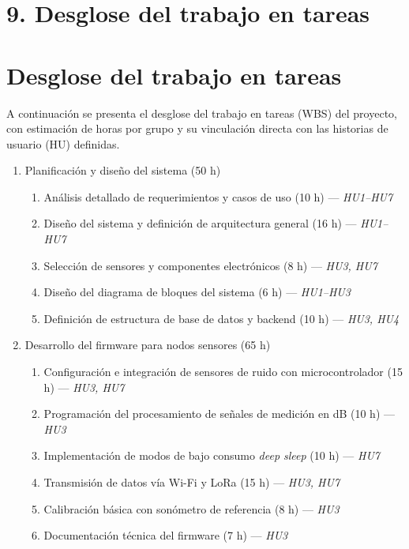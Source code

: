 \documentclass[
11pt, %
]{charter}
\begin{document}
\section{9. Desglose del trabajo en tareas}
\label{sec:wbs}

\section{Desglose del trabajo en tareas}

A continuación se presenta el desglose del trabajo en tareas (WBS) del proyecto, con estimación de horas por grupo y su vinculación directa con las historias de usuario (HU) definidas.

\begin{enumerate}
    \item Planificación y diseño del sistema (50 h)
    \begin{enumerate}
        \item Análisis detallado de requerimientos y casos de uso (10 h) — \textit{HU1–HU7}
        \item Diseño del sistema y definición de arquitectura general (16 h) — \textit{HU1–HU7}
        \item Selección de sensores y componentes electrónicos (8 h) — \textit{HU3, HU7}
        \item Diseño del diagrama de bloques del sistema (6 h) — \textit{HU1–HU3}
        \item Definición de estructura de base de datos y backend (10 h) — \textit{HU3, HU4}
    \end{enumerate}

    \item Desarrollo del firmware para nodos sensores (65 h)
    \begin{enumerate}
        \item Configuración e integración de sensores de ruido con microcontrolador (15 h) — \textit{HU3, HU7}
        \item Programación del procesamiento de señales de medición en dB (10 h) — \textit{HU3}
        \item Implementación de modos de bajo consumo  \textit{deep sleep} (10 h) — \textit{HU7}
        \item Transmisión de datos vía Wi-Fi y LoRa (15 h) — \textit{HU3, HU7}
        \item Calibración básica con sonómetro de referencia (8 h) — \textit{HU3}
        \item Documentación técnica del firmware (7 h) — \textit{HU3}
    \end{enumerate}


\end{enumerate}
\end{document}

